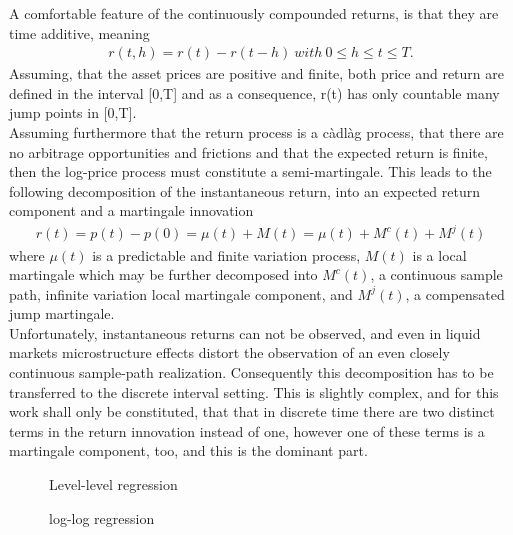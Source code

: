 A comfortable feature of the continuously compounded returns, is that they are time additive, meaning
\begin{align*}
r(t,h) = r(t) - r(t-h) \ with \ 0 \leq h \leq t \leq T.
\end{align*}
Assuming, that the asset prices are positive and finite, both price and return are defined in the interval [0,T] and as a consequence, r(t) has only countable many jump points in [0,T]. \\
Assuming furthermore that the return process is a càdlàg process, that there are no arbitrage opportunities and frictions and  that the expected return is finite, then the log-price process must constitute a semi-martingale. This leads to the following decomposition of the instantaneous return, into an expected return component and a martingale innovation
\begin{align*}
r(t) = p(t) - p(0) = \mu(t) + M(t) = \mu(t) + M^{c}(t) + M^{j}(t)
\end{align*}
where $\mu(t)$ is a predictable and finite variation process, $M(t)$ is a local martingale which may be further decomposed into $M^{c}(t)$, a continuous sample path, infinite variation local martingale component, and $M^{j}(t)$, a compensated jump martingale.\\
Unfortunately, instantaneous returns can not be observed, and even in liquid markets microstructure effects distort the observation of an even closely continuous sample-path realization. Consequently this decomposition has to be transferred to the discrete interval setting. This is slightly complex, and for this work shall only be constituted, that that in discrete time there are two distinct terms in the return innovation instead of one, however one of these terms is a martingale component, too, and this is the dominant part. 

\begin{figure}[!htbp]
\caption{Level-level regression}
\centering

\end{figure}
%
\begin{figure}[!htbp]
\caption{log-log regression}
\centering

\end{figure}
%


